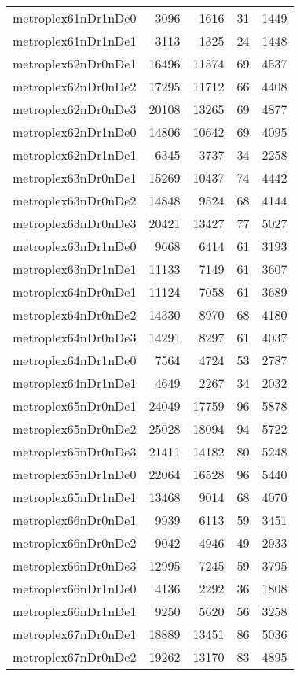 \begin{longtable}{lrrrr}
metroplex61nDr1nDe0 & 3096 & 1616 & 31 & 1449 \\
metroplex61nDr1nDe1 & 3113 & 1325 & 24 & 1448 \\
metroplex62nDr0nDe1 & 16496 & 11574 & 69 & 4537 \\
metroplex62nDr0nDe2 & 17295 & 11712 & 66 & 4408 \\
metroplex62nDr0nDe3 & 20108 & 13265 & 69 & 4877 \\
metroplex62nDr1nDe0 & 14806 & 10642 & 69 & 4095 \\
metroplex62nDr1nDe1 & 6345 & 3737 & 34 & 2258 \\
metroplex63nDr0nDe1 & 15269 & 10437 & 74 & 4442 \\
metroplex63nDr0nDe2 & 14848 & 9524 & 68 & 4144 \\
metroplex63nDr0nDe3 & 20421 & 13427 & 77 & 5027 \\
metroplex63nDr1nDe0 & 9668 & 6414 & 61 & 3193 \\
metroplex63nDr1nDe1 & 11133 & 7149 & 61 & 3607 \\
metroplex64nDr0nDe1 & 11124 & 7058 & 61 & 3689 \\
metroplex64nDr0nDe2 & 14330 & 8970 & 68 & 4180 \\
metroplex64nDr0nDe3 & 14291 & 8297 & 61 & 4037 \\
metroplex64nDr1nDe0 & 7564 & 4724 & 53 & 2787 \\
metroplex64nDr1nDe1 & 4649 & 2267 & 34 & 2032 \\
metroplex65nDr0nDe1 & 24049 & 17759 & 96 & 5878 \\
metroplex65nDr0nDe2 & 25028 & 18094 & 94 & 5722 \\
metroplex65nDr0nDe3 & 21411 & 14182 & 80 & 5248 \\
metroplex65nDr1nDe0 & 22064 & 16528 & 96 & 5440 \\
metroplex65nDr1nDe1 & 13468 & 9014 & 68 & 4070 \\
metroplex66nDr0nDe1 & 9939 & 6113 & 59 & 3451 \\
metroplex66nDr0nDe2 & 9042 & 4946 & 49 & 2933 \\
metroplex66nDr0nDe3 & 12995 & 7245 & 59 & 3795 \\
metroplex66nDr1nDe0 & 4136 & 2292 & 36 & 1808 \\
metroplex66nDr1nDe1 & 9250 & 5620 & 56 & 3258 \\
metroplex67nDr0nDe1 & 18889 & 13451 & 86 & 5036 \\
metroplex67nDr0nDe2 & 19262 & 13170 & 83 & 4895 \\

\end{longtable}
